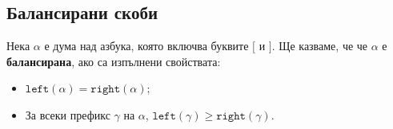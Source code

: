 \subsection{Балансирани скоби}

Нека $\alpha$ е дума над азбука, която включва буквите $\texttt{[}$ и $\texttt{]}$. 
Ще казваме, че че $\alpha$ е {\bf балансирана}, ако са изпълнени свойствата:
\begin{itemize}
\item 
  $\texttt{left}(\alpha) = \texttt{right}(\alpha)$;
\item
  За всеки префикс $\gamma$ на $\alpha$,
  $\texttt{left}(\gamma) \geq \texttt{right}(\gamma)$.
\end{itemize}

  

